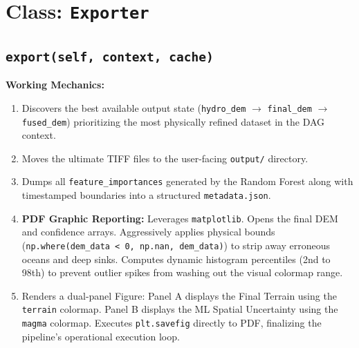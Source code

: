 \documentclass[11pt,a4paper,oneside]{report}
\begin{document}
\section{Class: \texttt{Exporter}}
\subsection{\texttt{export(self, context, cache)}}
\textbf{Working Mechanics:}
\begin{enumerate}
    \item Discovers the best available output state (\texttt{hydro\_dem} $\rightarrow$ \texttt{final\_dem} $\rightarrow$ \texttt{fused\_dem}) prioritizing the most physically refined dataset in the DAG context.
    \item Moves the ultimate TIFF files to the user-facing \texttt{output/} directory.
    \item Dumps all \texttt{feature\_importances} generated by the Random Forest along with timestamped boundaries into a structured \texttt{metadata.json}.
    \item \textbf{PDF Graphic Reporting:} Leverages \texttt{matplotlib}. Opens the final DEM and confidence arrays. Aggressively applies physical bounds (\texttt{np.where(dem\_data < 0, np.nan, dem\_data)}) to strip away erroneous oceans and deep sinks. Computes dynamic histogram percentiles (2nd to 98th) to prevent outlier spikes from washing out the visual colormap range.
    \item Renders a dual-panel Figure: Panel A displays the Final Terrain using the \texttt{terrain} colormap. Panel B displays the ML Spatial Uncertainty using the \texttt{magma} colormap. Executes \texttt{plt.savefig} directly to PDF, finalizing the pipeline's operational execution loop.
\end{enumerate}
\end{document}

